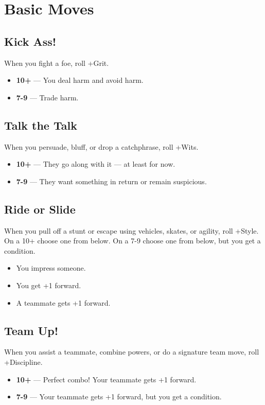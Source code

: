 \documentclass{book}
\begin{document}
\chapter*{Basic Moves}

\section*{Kick Ass!}
When you fight a foe, roll +Grit.
\begin{itemize}
    \item \textbf{10+} --- You deal harm and avoid harm.
    \item \textbf{7-9} --- Trade harm.
\end{itemize}

\section*{Talk the Talk}
When you persuade, bluff, or drop a catchphrase, roll +Wits.
\begin{itemize}
    \item \textbf{10+} --- They go along with it — at least for now.
    \item \textbf{7-9} --- They want something in return or remain suspicious.
\end{itemize}

\section*{Ride or Slide}
When you pull off a stunt or escape using vehicles, skates, or agility, roll +Style. On a 10+ choose one from below. On a 7-9 choose one from below, but you get a condition.
\begin{itemize}
    \item You impress someone.
    \item You get +1 forward.
    \item A teammate gets +1 forward.
\end{itemize}

\section*{Team Up!}
When you assist a teammate, combine powers, or do a signature team move, roll +Discipline.
\begin{itemize}
    \item \textbf{10+} --- Perfect combo! Your teammate gets +1 forward.
    \item \textbf{7-9} --- Your teammate gets +1 forward, but you get a condition.
\end{itemize}
\end{document}
